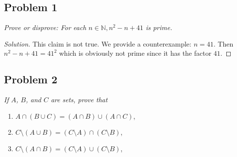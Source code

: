 \documentclass{article}
\newcommand{\N}{{\mathbb N}}
\begin{document}
\subsection*{Problem 1}
\textit{Prove or disprove: For each $n\in\N, n^2-n+41$ is prime.}
\begin{proof}[Solution]\let\qed\relax
This claim is not true.
We provide a counterexample: $n = 41$.
Then $n^2 - n + 41 = 41^2$
which is obviously not prime since it has the factor $41$.
\end{proof}
\clearpage

\subsection*{Problem 2}
{\it If $A$, $B$, and $C$ are sets, prove that
\begin{enumerate}
	\item $A \cap (B \cup C) = (A \cap B) \cup (A \cap C)$,
	\item $C \setminus (A \cup B) = (C \setminus A) \cap (C \setminus B)$,
	\item $C \setminus (A \cap B) = (C \setminus A) \cup (C \setminus B)$,
\end{enumerate}}
\end{document}
